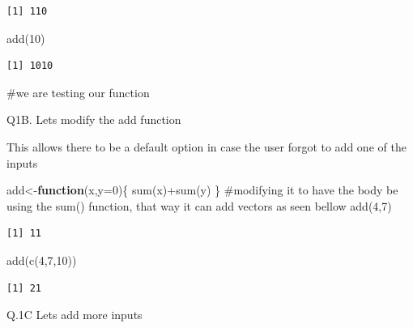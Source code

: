 \documentclass[
  letterpaper,
  DIV=11,
  numbers=noendperiod]{scrartcl}
\newenvironment{Shaded}{\begin{snugshade}}{\end{snugshade}}
\newcommand{\AttributeTok}[1]{\textcolor[rgb]{0.40,0.45,0.13}{#1}}
\newcommand{\CommentTok}[1]{\textcolor[rgb]{0.37,0.37,0.37}{#1}}
\newcommand{\ControlFlowTok}[1]{\textcolor[rgb]{0.00,0.23,0.31}{\textbf{#1}}}
\newcommand{\DecValTok}[1]{\textcolor[rgb]{0.68,0.00,0.00}{#1}}
\newcommand{\FunctionTok}[1]{\textcolor[rgb]{0.28,0.35,0.67}{#1}}
\newcommand{\NormalTok}[1]{\textcolor[rgb]{0.00,0.23,0.31}{#1}}
\newcommand{\OtherTok}[1]{\textcolor[rgb]{0.00,0.23,0.31}{#1}}
\newcommand{\SpecialCharTok}[1]{\textcolor[rgb]{0.37,0.37,0.37}{#1}}
\begin{document}
\begin{verbatim}
[1] 110
\end{verbatim}

\begin{Shaded}
\begin{Highlighting}[]
\FunctionTok{add}\NormalTok{(}\DecValTok{10}\NormalTok{)}
\end{Highlighting}
\end{Shaded}

\begin{verbatim}
[1] 1010
\end{verbatim}

\begin{Shaded}
\begin{Highlighting}[]
\CommentTok{\#we are testing our function}
\end{Highlighting}
\end{Shaded}

Q1B. Lets modify the add function

This allows there to be a default option in case the user forgot to add
one of the inputs

\begin{Shaded}
\begin{Highlighting}[]
\NormalTok{add}\OtherTok{\textless{}{-}}\ControlFlowTok{function}\NormalTok{(x,}\AttributeTok{y=}\DecValTok{0}\NormalTok{)\{}
  \FunctionTok{sum}\NormalTok{(x)}\SpecialCharTok{+}\FunctionTok{sum}\NormalTok{(y)}
\NormalTok{\}}
\CommentTok{\#modifying it to have the body be using the sum() function, that way it can add vectors as seen bellow}
\FunctionTok{add}\NormalTok{(}\DecValTok{4}\NormalTok{,}\DecValTok{7}\NormalTok{)}
\end{Highlighting}
\end{Shaded}

\begin{verbatim}
[1] 11
\end{verbatim}

\begin{Shaded}
\begin{Highlighting}[]
\FunctionTok{add}\NormalTok{(}\FunctionTok{c}\NormalTok{(}\DecValTok{4}\NormalTok{,}\DecValTok{7}\NormalTok{,}\DecValTok{10}\NormalTok{))}
\end{Highlighting}
\end{Shaded}

\begin{verbatim}
[1] 21
\end{verbatim}

Q.1C Lets add more inputs
\end{document}
